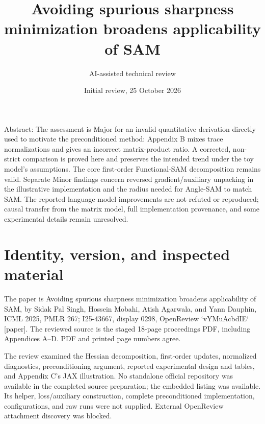 \documentclass[10pt]{article}
\title{Avoiding spurious sharpness minimization broadens applicability of SAM}
\author{AI-assisted technical review}
\date{Initial review, 25 October 2026}
\begin{document}
\maketitle
Abstract: The assessment is Major for an invalid quantitative derivation directly used to motivate the preconditioned method: Appendix B mixes trace normalizations and gives an incorrect matrix-product ratio. A corrected, non-strict comparison is proved here and preserves the intended trend under the toy model’s assumptions. The core first-order Functional-SAM decomposition remains valid. Separate Minor findings concern reversed gradient/auxiliary unpacking in the illustrative implementation and the radius needed for Angle-SAM to match SAM. The reported language-model improvements are not refuted or reproduced; causal transfer from the matrix model, full implementation provenance, and some experimental details remain unresolved.\par
\section*{Identity, version, and inspected material}
The paper is Avoiding spurious sharpness minimization broadens applicability of SAM, by Sidak Pal Singh, Hossein Mobahi, Atish Agarwala, and Yann Dauphin, ICML 2025, PMLR 267; I25-43667, display 0298, OpenReview `vYMuAcbdIE` [paper]. The reviewed source is the staged 18-page proceedings PDF, including Appendices A–D. PDF and printed page numbers agree.\par
The review examined the Hessian decomposition, first-order updates, normalized diagnostics, preconditioning argument, reported experimental design and tables, and Appendix C’s JAX illustration. No standalone official repository was available in the completed source preparation; the embedded listing was available. Its helper, loss/auxiliary construction, complete preconditioned implementation, configurations, and raw runs were not supplied. External OpenReview attachment discovery was blocked.\par
\end{document}
